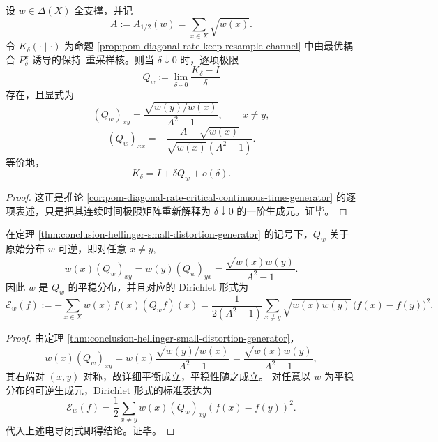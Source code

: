 \begin{theorem}\label{thm:conclusion-hellinger-small-distortion-generator}
设 \(w\in \Delta(X)\) 全支撑，并记
\[
A:=A_{1/2}(w)=\sum_{x\in X}\sqrt{w(x)}.
\]
令 \(K_\delta(\cdot\mid\cdot)\) 为命题 \ref{prop:pom-diagonal-rate-keep-resample-channel} 中由最优耦合 \(P_\delta^\star\) 诱导的保持--重采样核。则当 \(\delta\downarrow 0\) 时，逐项极限
\[
Q_w:=\lim_{\delta\downarrow0}\frac{K_\delta-I}{\delta}
\]
存在，且显式为
\[
(Q_w)_{xy}=
\frac{\sqrt{w(y)/w(x)}}{A^2-1},
\qquad x\ne y,
\]
\[
(Q_w)_{xx}
=
-\frac{A-\sqrt{w(x)}}{\sqrt{w(x)}(A^2-1)}.
\]
等价地，
\[
K_\delta=I+\delta Q_w+o(\delta).
\]
\end{theorem}
\begin{proof}
这正是推论 \ref{cor:pom-diagonal-rate-critical-continuous-time-generator} 的逐项表述，只是把其连续时间极限矩阵重新解释为 \(\delta\downarrow 0\) 的一阶生成元。证毕。
\end{proof}

\begin{corollary}\label{cor:conclusion-hellinger-generator-reversibility-dirichlet}
在定理 \ref{thm:conclusion-hellinger-small-distortion-generator} 的记号下，\(Q_w\) 关于原始分布 \(w\) 可逆，即对任意 \(x\ne y\),
\[
w(x)(Q_w)_{xy}=w(y)(Q_w)_{yx}
=
\frac{\sqrt{w(x)w(y)}}{A^2-1}.
\]
因此 \(w\) 是 \(Q_w\) 的平稳分布，并且对应的 Dirichlet 形式为
\[
\mathcal E_w(f)
:=
-\sum_{x\in X}w(x)f(x)(Q_wf)(x)
=
\frac{1}{2(A^2-1)}
\sum_{x\ne y}\sqrt{w(x)w(y)}\,\bigl(f(x)-f(y)\bigr)^2.
\]
\end{corollary}
\begin{proof}
由定理 \ref{thm:conclusion-hellinger-small-distortion-generator}，
\[
w(x)(Q_w)_{xy}
=
w(x)\frac{\sqrt{w(y)/w(x)}}{A^2-1}
=
\frac{\sqrt{w(x)w(y)}}{A^2-1},
\]
其右端对 \((x,y)\) 对称，故详细平衡成立，平稳性随之成立。
对任意以 \(w\) 为平稳分布的可逆生成元，Dirichlet 形式的标准表达为
\[
\mathcal E_w(f)=\frac12\sum_{x\ne y}w(x)(Q_w)_{xy}(f(x)-f(y))^2.
\]
代入上述电导闭式即得结论。证毕。
\end{proof}

